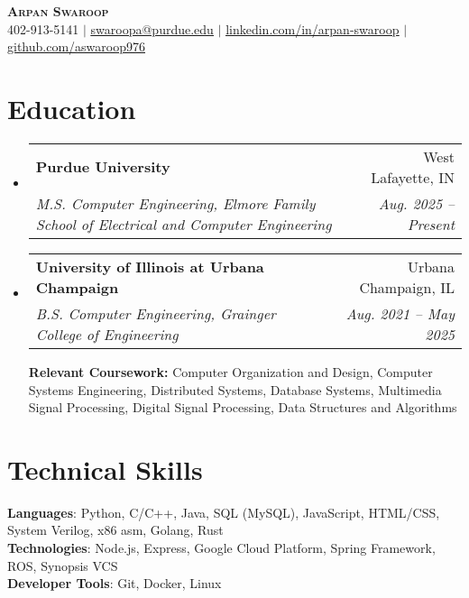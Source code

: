 \documentclass[letterpaper,10pt]{article}
\makeatletter
\newcommand{\resumeEduListStart}{%
  \begin{itemize}[leftmargin=0.15in, label={}, itemsep=4pt, topsep=2pt, parsep=0pt, partopsep=0pt]%
}
\newcommand{\resumeEduSubheading}[4]{%
  \vspace{-1pt}\item
  \begin{tabular*}{0.97\textwidth}[t]{l@{\extracolsep{\fill}}r}
    \textbf{#1} & #2 \\
    \textit{\small #3} & \textit{\small #4} \\
  \end{tabular*}\vspace{-2pt} %
}
\newcommand{\resumeSubHeadingListEnd}{\end{itemize}}
\makeatother
\begin{document}
\begin{center}
  \textbf{\Huge \scshape Arpan Swaroop} \\ \vspace{1pt}
  \small 402-913-5141 $|$ \href{mailto:swaroopa@purdue.edu}{\underline{swaroopa@purdue.edu}} $|$
  \href{https://www.linkedin.com/in/arpan-swaroop-008b04256/}{\underline{linkedin.com/in/arpan-swaroop}} $|$
  \href{https://github.com/aswaroop976}{\underline{github.com/aswaroop976}}
\end{center}

\section{Education}
\resumeEduListStart

\resumeEduSubheading
{Purdue University}{West Lafayette, IN}
{M.S. Computer Engineering, Elmore Family School of Electrical and Computer Engineering}{Aug. 2025 -- Present}

\resumeEduSubheading
{University of Illinois at Urbana Champaign}{Urbana Champaign, IL}
{B.S. Computer Engineering, Grainger College of Engineering}{Aug. 2021 -- May 2025}

\vspace{4pt}
\textbf{Relevant Coursework: } 
Computer Organization and Design, Computer Systems Engineering, Distributed Systems, 
Database Systems, Multimedia Signal Processing, Digital Signal Processing, Data Structures and Algorithms


\resumeSubHeadingListEnd

\section{Technical Skills}
\begin{itemize}[leftmargin=0.15in, label={}]
  \small{\item{
                \textbf{Languages}{: Python, C/C++, Java, SQL (MySQL), JavaScript, HTML/CSS, System Verilog, x86 asm, Golang, Rust} \\
                \textbf{Technologies}{: Node.js, Express, Google Cloud Platform, Spring Framework, ROS, Synopsis VCS} \\
                \textbf{Developer Tools}{: Git, Docker, Linux} \\
          }}
\end{itemize}

\end{document}
